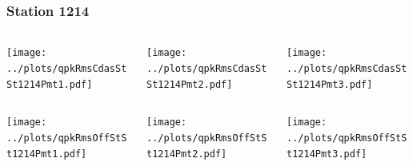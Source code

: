 \documentclass[aspectratio=169]{beamer}
\begin{document}
\begin{frame} 
  \frametitle{Station 1214}
  \begin{center}
    \begin{columns}
      \begin{column}{0.33\textwidth}
        \texttt{[image: ../plots/qpkRmsCdasStSt1214Pmt1.pdf]}
      \end{column}
      \begin{column}{0.33\textwidth}
        \texttt{[image: ../plots/qpkRmsCdasStSt1214Pmt2.pdf]}
      \end{column}
      \begin{column}{0.33\textwidth}
        \texttt{[image: ../plots/qpkRmsCdasStSt1214Pmt3.pdf]}
      \end{column}
    \end{columns}
  \end{center}

  \begin{center}
    \begin{columns}
      \begin{column}{0.33\textwidth}
        \texttt{[image: ../plots/qpkRmsOffStSt1214Pmt1.pdf]}
      \end{column}
      \begin{column}{0.33\textwidth}
        \texttt{[image: ../plots/qpkRmsOffStSt1214Pmt2.pdf]}
      \end{column}
      \begin{column}{0.33\textwidth}
        \texttt{[image: ../plots/qpkRmsOffStSt1214Pmt3.pdf]}
      \end{column}
    \end{columns}
  \end{center}
\end{frame}
\end{document}
